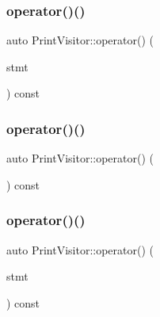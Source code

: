 \mbox{\label{struct_print_visitor_ab9b67d2fa5b46a015d1494f49c90429f}} 
\subsubsection{\texorpdfstring{operator()()}{operator()()}\hspace{0.1cm}{\footnotesize\ttfamily [15/38]}}
{\footnotesize\ttfamily auto Print\+Visitor\+::operator() (\begin{DoxyParamCaption}\item[{const \hyperlink{struct_block}{Block} \&}]{stmt }\end{DoxyParamCaption}) const\hspace{0.3cm}{\ttfamily [inline]}}

\mbox{\label{struct_print_visitor_a83468e61f7ceac2f1183fe3922d6a3b8}} 
\subsubsection{\texorpdfstring{operator()()}{operator()()}\hspace{0.1cm}{\footnotesize\ttfamily [16/38]}}
{\footnotesize\ttfamily auto Print\+Visitor\+::operator() (\begin{DoxyParamCaption}\item[{const \hyperlink{struct_empty_statement}{Empty\+Statement} \&}]{ }\end{DoxyParamCaption}) const\hspace{0.3cm}{\ttfamily [inline]}}

\mbox{\label{struct_print_visitor_ac29604a9979af1bb98ac84fe34c76025}} 
\subsubsection{\texorpdfstring{operator()()}{operator()()}\hspace{0.1cm}{\footnotesize\ttfamily [17/38]}}
{\footnotesize\ttfamily auto Print\+Visitor\+::operator() (\begin{DoxyParamCaption}\item[{const \hyperlink{struct_expression_statement}{Expression\+Statement} \&}]{stmt }\end{DoxyParamCaption}) const\hspace{0.3cm}{\ttfamily [inline]}}

